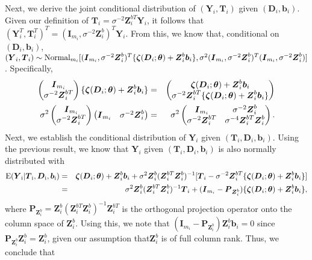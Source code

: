 \documentclass[12pt]{article}
\def\Normal{\hbox{Normal}}
\def\bse{\begin{eqnarray*}}
\def\ese{\end{eqnarray*}}
\def\be{\begin{eqnarray}}
\def\ee{\end{eqnarray}}
\def\bse{\begin{eqnarray*}}
\def\ese{\end{eqnarray*}}
\newcommand{\bzeta}{\mbox{\boldmath $\zeta$}}
\def\btheta{{\boldsymbol{\theta}}}
\def\bb{{\boldsymbol b}}
\def\bD{{\boldsymbol D}}
\def\bI{{\boldsymbol I}}
\def\bP{{\boldsymbol P}}
\def\bT{{\boldsymbol T}}
\def\bY{{\boldsymbol Y}}
\def\bZ{{\boldsymbol Z}}
\def\tilD{\bD}
\begin{document}
Next, we derive the joint conditional distribution of $(\bY_i, \bT_i)$ given $(\tilD_i,\bb_i)$. Given our definition of $\bT_i=\sigma^{-2}\bZ^{bT}_i\bY_i$, it follows that $(\bY_i^T, \bT_i^T)^T = (\bI_{m_i}, \sigma^{-2}\bZ_i^b)^T \bY_i$. From this, we know that, conditional on $(\tilD_i,\bb_i)$, $(\bY_i, \bT_i)\sim\Normal_{m_i}[(\bI_{m_i}, \sigma^{-2}\bZ_i^b)^T\{\bzeta(\tilD_i;\btheta) + \bZ_i^b\bb_i\}, \sigma^2(\bI_{m_i}, \sigma^{-2}\bZ_i^b)^T(\bI_{m_i}, \sigma^{-2}\bZ_i^b)]$. Specifically,
\be
\left(
\begin{matrix}
\bI_{m_i} \\
\sigma^{-2}\bZ_i^{bT}
\end{matrix}
\right)\{
\bzeta(\tilD_i;\btheta) + \bZ_i^b\bb_i\}
\nonumber&=& 
\left(
\begin{matrix}
\bzeta(\tilD_i;\btheta) + \bZ_i^b\bb_i \\
\sigma^{-2}\bZ_i^{bT}\{\bzeta(\tilD_i;\btheta) + \bZ_i^b\bb_i\}
\end{matrix}
\right) \label{eqn:YW-distr} \\
\sigma^2 
\left(
\begin{matrix}
\bI_{m_i} \\
\sigma^{-2}\bZ_i^{bT}
\end{matrix}
\right)
\left(
\begin{matrix}
\bI_{m_i} &
\sigma^{-2}\bZ_i^b
\end{matrix}
\right) &=&
\sigma^2
\left(
\begin{matrix}
\bI_{m_i} & \sigma^{-2}\bZ_i^b \\
\sigma^{-2}\bZ_i^{bT} & 
\sigma^{-4}\bZ_i^{bT}\bZ_i^b
\end{matrix}
\right).\nonumber
\ee
Next, we establish the conditional distribution of $\bY_i$ given $(\bT_i, \tilD_i,\bb_i)$. Using the previous result, we know that $\bY_i$ given $(\bT_i, \tilD_i,\bb_i)$ is also normally distributed with
\bse
\rm{E}(\bY_i|\bT_i,\tilD_i,\bb_i)&=&\bzeta(\tilD_i;\btheta)+\bZ_i^b\bb_i+\sigma^2\bZ_i^b(\bZ_i^{bT}\bZ_i^b)^{-1}[\bT_i - \sigma^{-2}\bZ_i^{bT}\{\bzeta(\tilD_i;\btheta) + \bZ_i^b\bb_i\}]\\
&=& \sigma^2\bZ_i^b(\bZ_i^{bT}\bZ_i^b)^{-1}\bT_i + (\bI_{m_i} - \bP_{\bZ_i^b})\{\bzeta(\tilD_i;\btheta) + \bZ_i^b\bb_i\},
\ese
where $\bP_{\bZ_i^b} = \bZ_i^b(\bZ_i^{bT}\bZ_i^b)^{-1}\bZ_i^{bT}$ is the orthogonal projection operator onto the column space of $\bZ_i^b$. Using this, we note that  $(\bI_{m_i} - \bP_{\bZ_i^b})\bZ_i^b\bb_i=0$ since $\bP_{\bZ_i^b}\bZ_i^b = \bZ_i^b$, given our assumption that$\bZ_i^b$ is of full column rank. Thus, we conclude that
\end{document}
